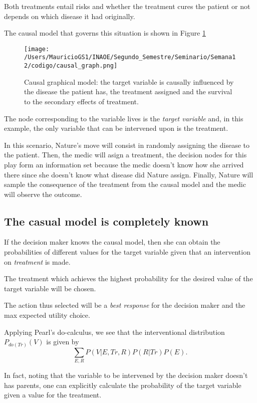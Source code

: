 \documentclass{article}
\begin{document}
Both treatments entail risks and whether the treatment cures the patient or not depends on which disease it had originally.

The causal model that governs this situation is shown in Figure \ref{causal_model}

\begin{figure}[ht]
\vskip 0.2in
\begin{center}
\centerline{\texttt{[image: /Users/MauricioGS1/INAOE/Segundo\_Semestre/Seminario/Semana12/codigo/causal\_graph.png]}}
\caption{Causal graphical model: the target variable is causally influenced by the disease the patient has, the treatment assigned and the survival to the secondary effects of treatment.}
\label{causal_model}
\end{center}
\vskip -0.2in
\end{figure}

The node corresponding to the variable lives is the \textit{target variable} and, in this example, the only variable that can be intervened upon is the treatment.

In this scenario, Nature's move will consist in randomly assigning the disease to the patient. Then, the medic will asign a treatment, the decision nodes for this play form an information set because the medic doesn't know how she arrived there since she doesn't know what disease did Nature assign. Finally, Nature will sample the consequence of the treatment from the causal model and the medic will observe the outcome.

\subsection{The casual model is completely known}
If the decision maker knows the causal model, then she can obtain the probabilities of different values for the target variable given that an intervention on \textit{treatment} is made. 

The treatment which achieves the highest probability for the desired value of the target variable will be chosen.

The action thus selected will be a \textit{best response} for the decision maker and the max expected utility choice.

Applying Pearl's \cite{pearl2009causality} do-calculus, we see that the interventional distribution $P_{do(Tr)}(V)$ is given by
\[ \sum_{E,R}P(V|E,Tr,R)P(R|Tr)P(E). \]

In fact, noting that the variable to be intervened by the decision maker doesn't has parents, one can explicitly calculate the probability of the target variable given a value for the treatment. 
\end{document}
